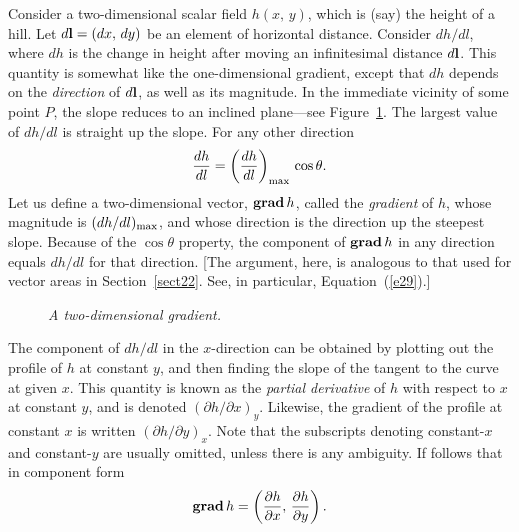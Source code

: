 Consider a two-dimensional scalar field $h(x,\,y)$, which is (say) the height of a hill.
Let  $d{\bf l}=(dx,\,dy)$ be an element of horizontal distance. Consider
$dh/dl$, where $dh$ is the change in height after moving an infinitesimal distance
$d{\bf l}$. This quantity is  somewhat like the one-dimensional gradient, except that
$dh$ depends on the {\em direction} of $d{\bf l}$, as well as its magnitude. 
In the immediate vicinity of some point $P$, the slope reduces to an inclined plane---see Figure~\ref{f15}.
The largest value of $dh/dl$ is straight up the slope. For any other direction
\begin{equation}
\frac{dh}{dl}= \left(\frac{dh}{dl}\right)_{\rm max}\, \cos\theta.
\end{equation}
Let us define a two-dimensional vector, ${\bf  grad}\,h$, 
called the {\em gradient} of $h$, whose magnitude is
$(dh/dl)_{\rm max}$, and whose direction is the direction up the steepest slope.
Because of the $\cos\theta$ property, the component of ${\bf grad}\,h$ in any
direction equals $dh/dl$ for that direction. [The argument, here, is analogous to
that used for vector areas in Section~\ref{sect22}. See, in particular, Equation~(\ref{e29}).]
\begin{figure}
\epsfysize=2.25in
\centerline{}
\caption{\em A two-dimensional gradient.}\label{f15}
\end{figure}

The component of $dh/dl$ in the $x$-direction can be  obtained by plotting out the
profile of $h$ at constant $y$, and then finding the slope of the tangent to the
curve at given $x$. This quantity is known as the {\em partial derivative} of
$h$ with respect to $x$ at constant $y$, and is denoted $(\partial h/\partial x)_y$.
Likewise, the gradient of the profile at constant $x$ is written
$(\partial h/\partial y)_x$. Note that the subscripts denoting constant-$x$ and
constant-$y$ are usually omitted, unless there is any ambiguity. If follows that
in component form
\begin{equation}
{\bf grad}\,h = \left(\frac{\partial h}{\partial x},\, \frac{\partial h}{\partial y}
\right).
\end{equation}

